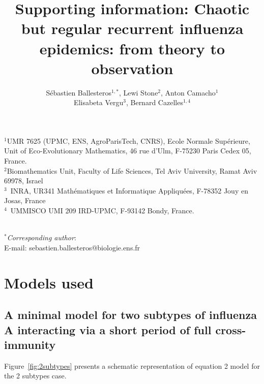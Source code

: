 \documentclass[12pt]{article}
\title{Supporting information: Chaotic but regular
  recurrent influenza epidemics: from theory to observation}
\author{Sébastien Ballesteros$^{1,*}$, Lewi
  Stone$^{2}$,  Anton Camacho$^{1}$\\ Elisabeta Vergu$^{3}$, Bernard Cazelles$^{1,4}$}
\date{}
\begin{document}
\maketitle


$^1$UMR 7625  (UPMC, ENS, AgroParisTech, CNRS), Ecole Normale
Supérieure, Unit of Eco-Evolutionary Mathematics,  46 rue d'Ulm,
F-75230 Paris Cedex 05, France. \\
$^2$Biomathematics Unit, Faculty of Life Sciences, Tel Aviv
University, Ramat Aviv 69978, Israel \\
$^3$~INRA, UR341 Mathématiques et Informatique Appliquées, F-78352 Jouy en Josas, France \\
$^4$~UMMISCO UMI 209 IRD-UPMC, F-93142 Bondy, France.

~\\
$^*$\textit{Corresponding author}:  \\
E-mail: sebastien.ballesteros@biologie.ens.fr

\tableofcontents

\section{Models used}

\subsection{A minimal model for two subtypes of influenza A interacting
    via a short period of full cross-immunity}

  Figure~\ref{fig:2subtypes} presents a schematic representation of
  equation 2 model for the 2 subtypes case.
 
\end{document}
